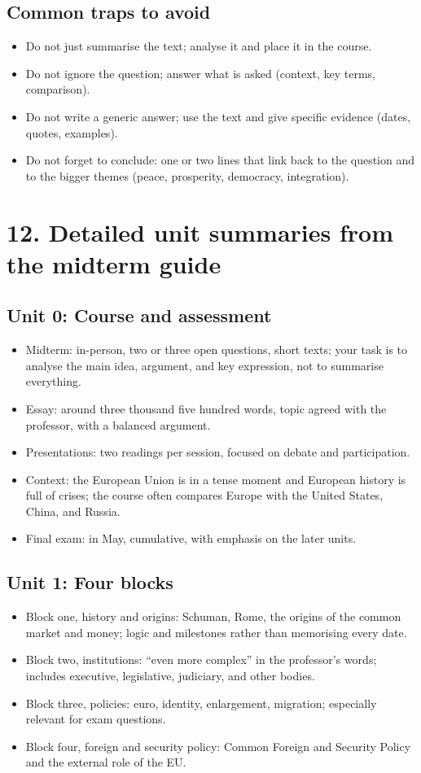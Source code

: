 \documentclass[10pt,a4paper]{article}
\begin{document}
\subsection*{Common traps to avoid}
\begin{itemize}
\item Do not just summarise the text; analyse it and place it in the course.
\item Do not ignore the question; answer what is asked (context, key terms, comparison).
\item Do not write a generic answer; use the text and give specific evidence (dates, quotes, examples).
\item Do not forget to conclude: one or two lines that link back to the question and to the bigger themes (peace, prosperity, democracy, integration).
\end{itemize}
\section*{12. Detailed unit summaries from the midterm guide}

\subsection*{Unit 0: Course and assessment}
\begin{itemize}
\item Midterm: in-person, two or three open questions, short texts; your task is to analyse the main idea, argument, and key expression, not to summarise everything.
\item Essay: around three thousand five hundred words, topic agreed with the professor, with a balanced argument.
\item Presentations: two readings per session, focused on debate and participation.
\item Context: the European Union is in a tense moment and European history is full of crises; the course often compares Europe with the United States, China, and Russia.
\item Final exam: in May, cumulative, with emphasis on the later units.
\end{itemize}

\subsection*{Unit 1: Four blocks}
\begin{itemize}
\item Block one, history and origins: Schuman, Rome, the origins of the common market and money; logic and milestones rather than memorising every date.
\item Block two, institutions: “even more complex” in the professor’s words; includes executive, legislative, judiciary, and other bodies.
\item Block three, policies: euro, identity, enlargement, migration; especially relevant for exam questions.
\item Block four, foreign and security policy: Common Foreign and Security Policy and the external role of the EU.
\end{itemize}
\end{document}
